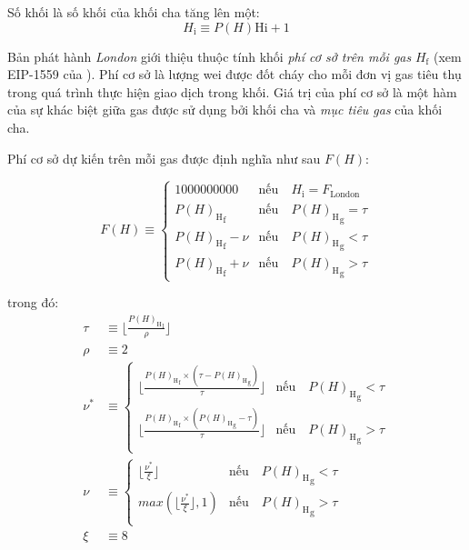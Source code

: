 \documentclass[9pt,oneside]{amsart}
\makeatletter
\newcommand{\linkdest}[1]{\Hy@raisedlink{\hypertarget{#1}{}}}
\makeatother
\begin{document}
\begin{multicols}{2}
\hypertarget{block_number_H__i}{}Số khối là số khối của khối cha tăng lên một:
\begin{equation}
H_{\mathrm{i}} \equiv {{P(H){\mathrm{H}}}{\mathrm{i}}} + 1
\end{equation}

\newcommand{\mindifficulty}{D_\mathrm{min}}
\newcommand{\homesteadmod}{\ensuremath{\varsigma_2}}
\newcommand{\expdiffsymb}{\ensuremath{\epsilon}}
\newcommand{\diffadjustment}{x}

\linkdest{H__f}Bản phát hành \textit{London} giới thiệu thuộc tính khối \textit{phí cơ sở trên mỗi gas} \hyperlink{block_baseFeePerGas_H__f}{$H_{\mathrm{f}}$} (xem EIP-1559 của \cite{EIP-1559}).
Phí cơ sở là lượng wei được đốt cháy cho mỗi đơn vị gas tiêu thụ trong quá trình thực hiện giao dịch trong khối.
Giá trị của phí cơ sở là một hàm của sự khác biệt giữa gas được sử dụng bởi khối cha và \textit{mục tiêu gas} của khối cha.

Phí cơ sở dự kiến trên mỗi gas được định nghĩa như sau $F(H)$:

\begin{equation}
  F(H) \equiv \begin{cases} 
    1000000000  & \text{nếu} \quad H_{\mathrm{i}} = F_{\mathrm{London}} \\
    {P(H)_{\mathrm{H}}}_{\mathrm{f}}  & \text{nếu} \quad {P(H)_{\mathrm{H}}}_{\mathrm{g}} = \tau \\
    {P(H)_{\mathrm{H}}}_{\mathrm{f}} - \nu & \text{nếu} \quad {P(H)_{\mathrm{H}}}_{\mathrm{g}} < \tau \\
    {P(H)_{\mathrm{H}}}_{\mathrm{f}} + \nu & \text{nếu} \quad {P(H)_{\mathrm{H}}}_{\mathrm{g}} > \tau
  \end{cases}
  \end{equation}

trong đó:
  \begin{align}
    \tau &\equiv \lfloor\frac{{P(H)_{\mathrm{H}}}_{\mathrm{l}}}{\rho} \rfloor \\
    \rho &\equiv 2 \\
    \nu^* &\equiv \begin{cases}
      \lfloor \frac{{P(H)_{\mathrm{H}}}_{\mathrm{f}} \times ({\tau - P(H)_{\mathrm{H}}}_{\mathrm{g}})}{\tau} \rfloor &  \text{nếu} \quad {P(H)_{\mathrm{H}}}_{\mathrm{g}} < \tau \\
      \lfloor \frac{{P(H)_{\mathrm{H}}}_{\mathrm{f}} \times ({P(H)_{\mathrm{H}}}_{\mathrm{g}} - \tau)}{\tau} \rfloor &  \text{nếu} \quad {P(H)_{\mathrm{H}}}_{\mathrm{g}} > \tau \\
  \end{cases} \\
  \nu &\equiv \begin{cases}
    \lfloor \frac{\nu^*}{\xi} \rfloor &  \text{nếu} \quad {P(H)_{\mathrm{H}}}_{\mathrm{g}} < \tau \\
    max(\lfloor \frac{\nu^*}{\xi} \rfloor, 1) &  \text{nếu} \quad {P(H)_{\mathrm{H}}}_{\mathrm{g}} > \tau \\
  \end{cases} \\
  \xi &\equiv 8
\end{align}


\end{multicols}
\end{document}
